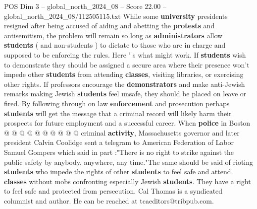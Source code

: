 \begin{textsample}{POS Dim 3 – global\_north\_2024\_08 – Score 22.00 – global\_north\_2024\_08/112505115.txt}
While some \textbf{university} presidents resigned after being accused of aiding and abetting the \textbf{protests} and antisemitism, the problem will remain so long as \textbf{administrators} allow \textbf{students} ( and non-students ) to dictate to those who are in charge and supposed to be enforcing the rules.
Here ' s what might work.
If \textbf{students} wish to demonstrate they should be assigned a secure area where their presence won't impede other \textbf{students} from attending \textbf{classes}, visiting libraries, or exercising other rights.
If professors encourage the \textbf{demonstrators} and make anti-Jewish remarks making Jewish \textbf{students} feel unsafe, they should be placed on leave or fired.
By following through on law \textbf{enforcement} and prosecution perhaps \textbf{students} will get the message that a criminal record will likely harm their prospects for future employment and a successful career.
When \textbf{police} in Boston @ @ @ @ @ @ @ @ @ @ criminal \textbf{activity}, Massachusetts governor and later president Calvin Coolidge sent a telegram to American Federation of Labor Samuel Gompers which said in part :"There is no right to strike against the public safety by anybody, anywhere, any time."The same should be said of rioting \textbf{students} who impede the rights of other \textbf{students} to feel safe and attend \textbf{classes} without mobs confronting especially Jewish \textbf{students}.
They have a right to feel safe and protected from persecution.
Cal Thomas is a syndicated columnist and author.
He can be reached at tcaeditors@tribpub.com.

\end{textsample}
